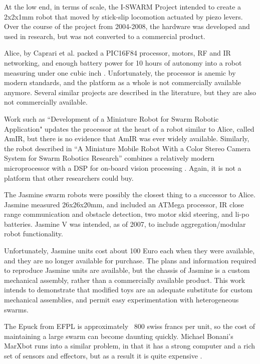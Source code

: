 \documentclass[]{article}
\begin{document}
At the low end, in terms of scale, the I-SWARM Project intended to create a 2x2x1mm robot that moved by stick-slip locomotion actuated by piezo levers\cite{seyfried2005swarm}. 
Over the course of the project from 2004-2008, the hardware was developed and used in research, but was not converted to a commercial product. 

Alice, by Caprari et al. packed a PIC16F84 processor, motors, RF and IR networking, and enough battery power for 10 hours of autonomy into a robot measuring under one cubic inch \cite{caprari1998autonomous}. 
Unfortunately, the processor is anemic by modern standards, and the platform as a whole is not commercially available anymore. 
Several similar projects are described in the literature, but they are also not commercially available. 

Work such as ``Development of a Miniature Robot for Swarm Robotic Application" updates the processor at the heart of a robot similar to Alice, called AmIR, but there is no evidence that AmIR was ever widely available\cite{arvin2009development}.
Similarly, the robot described in ``A Miniature Mobile Robot With a Color Stereo Camera System for Swarm Robotics Research'' combines a relatively modern microprocessor with a DSP for on-board vision processing \cite{haverinen2005miniature}. 
Again, it is not a platform that other researchers could buy.

The Jasmine swarm robots were possibly the closest thing to a successor to Alice.
Jasmine measured 26x26x20mm, and included an ATMega processor, IR close range communication and obstacle detection, two motor skid steering, and li-po batteries.
Jasmine V was intended, as of 2007, to include aggregation/modular robot functionality.  

Unfortunately, Jasmine units cost about 100 Euro each when they were available, and they are no longer available for purchase. 
The plans and information required to reproduce Jasmine units are available, but the chassis of Jasmine is a custom mechanical assembly, rather than a commercially available product. 
This work intends to demonstrate that modified toys are an adequate substitute for custom mechanical assemblies, and permit easy experimentation with heterogeneous swarms. 

The Epuck from EFPL is approximately ~800 swiss francs per unit, so the cost of maintaining a large swarm can become daunting quickly. Michael Bonani's MarXbot runs into a similar problem, in that it has a strong computer and a rich set of sensors and effectors, but as a result it is quite expensive \cite{bonani2010marxbot}. 
\end{document}
